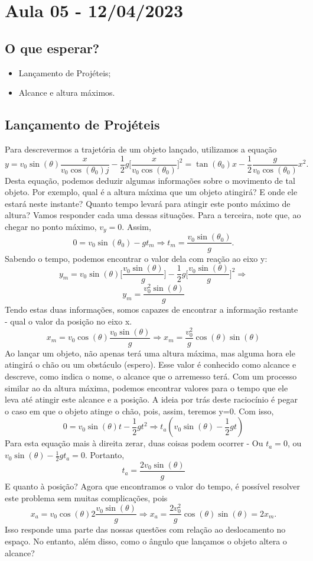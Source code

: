 \documentclass[physics_notes.tex]{subfiles}
\begin{document}
\section{Aula 05 - 12/04/2023}
\subsection{O que esperar?}
\begin{itemize}
	\item Lançamento de Projéteis;
	\item Alcance e altura máximos.
\end{itemize}
\subsection{Lançamento de Projéteis}
Para descrevermos a trajetória de um objeto lançado, utilizamos a equação
$$
	y = v_{0}\sin{(\theta )}\frac{x}{v_{0}\cos{(\theta _0)}j} - \frac{1}{2}g\biggl[\frac{x}{v_{0}\cos{(\theta _0)}}\biggr]^{2} = \tan{(\theta _{0})}x-\frac{1}{2}\frac{g}{v_{0}\cos{(\theta _{0})}}x^{2}.
$$
Desta equação, podemos deduzir algumas informações sobre o movimento de tal objeto. Por exemplo, qual é a altura máxima
que um objeto atingirá? E onde ele estará neste instante? Quanto tempo levará para atingir este ponto máximo de altura?
Vamos responder cada uma dessas situações. Para a terceira, note que, ao chegar no ponto máximo, $v_{y}=0.$ Assim,
$$
	0 = v_{0}\sin{(\theta_{0})}-gt_{m} \Rightarrow \boxed{t_{m} = \frac{v_{0}\sin{(\theta_{0})}}{g}.}
$$
Sabendo o tempo, podemos encontrar o valor dela com reação ao eixo y:
$$
	y_{m} = v_{0}\sin{(\theta )}\biggl[\frac{v_{0}\sin{(\theta )}}{g}\biggr] - \frac{1}{2}g\biggl[\frac{v_{0}\sin{(\theta )}}{g}\biggr]^{2} \Rightarrow
$$
$$
	\boxed{y_{m}=\frac{v_{0}^{2}\sin{(\theta )}}{g}}
$$
Tendo estas duas informações, somos capazes de encontrar a informação restante - qual o valor da posição no eixo x.
$$
	x_{m} = v_{0}\cos{(\theta )}\frac{v_{0}\sin{(\theta )}}{g} \Rightarrow \boxed{x_{m} = \frac{v_{0}^{2}}{g}\cos{(\theta )}\sin{(\theta )}}
$$
Ao lançar um objeto, não apenas terá uma altura máxima, mas alguma hora ele atingirá o chão ou um obstáculo (espero). Esse valor é
conhecido como alcance e descreve, como indica o nome, o alcance que o arremesso terá. Com um processo similar ao da
altura máxima, podemos encontrar valores para o tempo que ele leva até atingir este alcance e a posição. A ideia por trás deste
raciocínio é pegar o caso em que o objeto atinge o chão, pois, assim, teremos y=0. Com isso,
$$
	0 = v_{0}\sin{(\theta )}t - \frac{1}{2}gt^{2} \Rightarrow t_{a}(v_{0}\sin{(\theta )}-\frac{1}{2}gt)
$$
Para esta equação mais à direita zerar, duas coisas podem ocorrer - Ou $t_{a} = 0$, ou $v_{0}\sin{(\theta )} - \frac{1}{2}gt_{a}=0.$
Portanto,
$$
	\boxed{t_{a} = \frac{2v_{0}\sin{(\theta )}}{g}}
$$
E quanto à posição? Agora que encontramos o valor do tempo, é possível resolver este problema sem muitas complicações, pois
$$
	x_{a} = v_{0}\cos{(\theta )}2\frac{v_{0}\sin{(\theta )}}{g} \Rightarrow x_{a} = \frac{2v_{0}^{2}}{g}\cos{(\theta )}\sin{(\theta )} = 2x_{m}.
$$
Isso responde uma parte das nossas questões com relação ao deslocamento no espaço. No entanto, além disso, como o ângulo que
lançamos o objeto altera o alcance?
\end{document}
